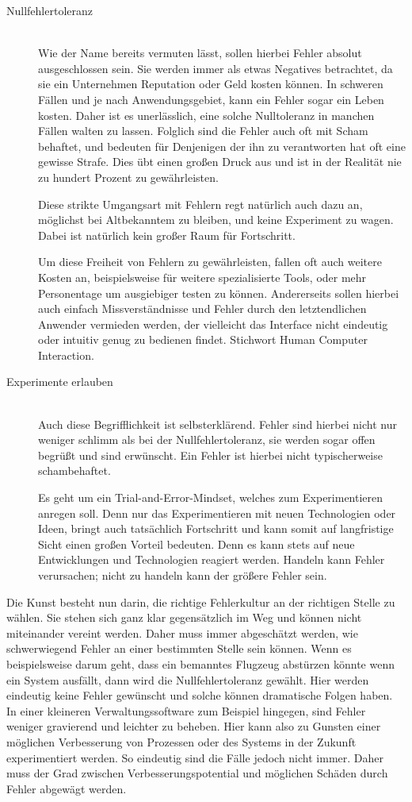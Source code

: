 \begin{description}
\item[Nullfehlertoleranz]\hfill\\ Wie der Name bereits vermuten lässt, sollen hierbei Fehler absolut ausgeschlossen sein. Sie werden immer als etwas Negatives betrachtet, da sie ein Unternehmen Reputation oder Geld kosten können. In schweren Fällen und je nach Anwendungsgebiet, kann ein Fehler sogar ein Leben kosten. Daher ist es unerlässlich, eine solche Nulltoleranz in manchen Fällen walten zu lassen. Folglich sind die Fehler auch oft mit Scham behaftet, und bedeuten für Denjenigen der ihn zu verantworten hat oft eine gewisse Strafe. Dies übt einen großen Druck aus und ist in der Realität nie zu hundert Prozent zu gewährleisten.

Diese strikte Umgangsart mit Fehlern regt natürlich auch dazu an, möglichst bei Altbekanntem zu bleiben, und keine Experiment zu wagen. Dabei ist natürlich kein großer Raum für Fortschritt.

Um diese Freiheit von Fehlern zu gewährleisten, fallen oft auch weitere Kosten an, beispielsweise für weitere spezialisierte Tools, oder mehr Personentage um ausgiebiger testen zu können. Andererseits sollen hierbei auch einfach Missverständnisse und Fehler durch den letztendlichen Anwender vermieden werden, der vielleicht das Interface nicht eindeutig oder intuitiv genug zu bedienen findet. Stichwort Human Computer Interaction.


\item[Experimente erlauben]\hfill\\ Auch diese Begrifflichkeit ist selbsterklärend. Fehler sind hierbei nicht nur weniger schlimm als bei der Nullfehlertoleranz, sie werden sogar offen begrüßt und sind erwünscht. Ein Fehler ist hierbei nicht typischerweise schambehaftet.

Es geht um ein Trial-and-Error-Mindset, welches zum Experimentieren anregen soll. Denn nur das Experimentieren mit neuen Technologien oder Ideen, bringt auch tatsächlich Fortschritt und kann somit auf langfristige Sicht einen großen Vorteil bedeuten. Denn es kann stets auf neue Entwicklungen und Technologien reagiert werden. \glqq Handeln kann Fehler verursachen; nicht zu handeln kann der größere Fehler sein.\grqq
\end{description}

Die Kunst besteht nun darin, die richtige Fehlerkultur an der richtigen Stelle zu wählen. Sie stehen sich ganz klar gegensätzlich im Weg und können nicht miteinander vereint werden. Daher muss immer abgeschätzt werden, wie schwerwiegend Fehler an einer bestimmten Stelle sein können. Wenn es beispielsweise darum geht, dass ein bemanntes Flugzeug abstürzen könnte wenn ein System ausfällt, dann wird die Nullfehlertoleranz gewählt. Hier werden eindeutig keine Fehler gewünscht und solche können dramatische Folgen haben. In einer kleineren Verwaltungssoftware zum Beispiel hingegen, sind Fehler weniger gravierend und leichter zu beheben. Hier kann also zu Gunsten einer möglichen Verbesserung von Prozessen oder des Systems in der Zukunft experimentiert werden. So eindeutig sind die Fälle jedoch nicht immer. Daher muss der Grad zwischen Verbesserungspotential und möglichen Schäden durch Fehler abgewägt werden.

